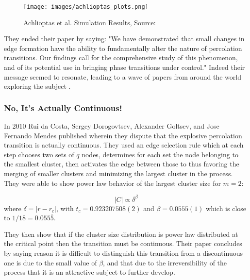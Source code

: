 \begin{figure}[H]
	\centering
	\texttt{[image: images/achlioptas\_plots.png]}
	\caption{Achlioptas et al. Simulation Results, Source: \cite{Achlioptas_1}}
	\label{fig:achlioptas_plots}
\end{figure}

They ended their paper by saying: "We have demonstrated that small changes in edge formation have the ability to fundamentally alter the nature of percolation transitions. Our findings call for the comprehensive study of this phenomenon, and of its potential use in bringing phase transitions under control."
Indeed their message seemed to resonate, leading to a wave of papers from around the world exploring the subject \cite{Ziff_1, Cho_1, Radicchi_1, Friedman_1, Ziff_2, Radicchi_2, D_Souza_1, da_Costa_1, Rozenfeld_1, Araujo_1, Moreira_1, Cho_2, Cho_3, Nagler_1, Manna_1, Grassberger_1, Lee_1, Riordan_1, Hooyberghs_1, Nagler_2, Chen_1, Panagiotou_1, Pan_1, Cho_4, Gomez_1, Tian_1, Riordan_2, Riordan_3, Boettcher_1, Chen_2, Angst_1, Bizhani_1, Cho_5, Schroeder_1, Chen_3, Chen_4, Squires_1, Do_1, Chen_5, Bastas_1, Cho_6, da_Costa_2, Riordan_4, Guan_1, da_Costa_5, da_Costa_3, da_Costa_4, D_Souza_2, Hayasaka_1, Clusella_1, Boccaletti_1, Gedik_1, Rahman_1, Waagen_1, Zhu_1, Sabbir_1, Trevelyan_1, Sabbir_1}.



\subsubsection{No, It's Actually Continuous!}
In 2010 Rui da Costa, Sergey Dorogovtsev, Alexander Goltsev, and Jose Fernando Mendes published \cite{da_Costa_1} wherein they dispute that the explosive percolation transition is actually continuous.
They used an edge selection rule which at each step chooses two sets of $q$ nodes, determines for each set the node belonging to the smallest cluster, then activates the edge between those to thus favoring the merging of smaller clusters and minimizing the largest cluster in the process.
They were able to show power law behavior of the largest cluster size for $m = 2$:

\begin{equation}
	|C| \propto \delta^\beta
\end{equation}
where $\delta = |r - r_c|$, with $t_c = 0.923207508(2)$ and $\beta = 0.0555(1)$ which is close to $1/18 = 0.055\overline{5}$.

They then show that if the cluster size distribution is power law distributed at the critical point then the transition must be continuous.
Their paper concludes by saying reason it is difficult to distinguish this transition from a discontinuous one is due to the small value of $\beta$, and that due to the irreversibility of the process that it is an attractive subject to further develop.



